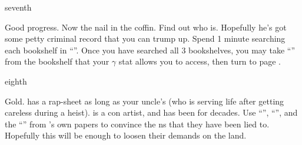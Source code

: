 \documentclass[greennotebook]{NeptuneBall}
\begin{document}
\begin{page}{seventh}

Good progress. Now the nail in the coffin. Find out who \cLiar{\MYname} is. Hopefully he's got some petty criminal record that you can trump up. Spend 1 minute searching each bookshelf in ``\sMuseum{}''. Once you have searched all 3 bookshelves, you may take ``\iRapSheet{}'' from the bookshelf that your $\gamma$ stat allows you to access, then turn to page .

\end{page}

\begin{page}{eighth}


Gold. \cLiar{\MYname} has a rap-sheet as long as your uncle's (who is serving life after getting careless during a heist). \cLiar{} is a con artist, and has been for decades. Use ``\iNorthSeasJournal{}'', ``\iRapSheet{}'', and the ``\iReference{}'' from \cPrince{}'s own papers to convince the \pPacifica{}ns that they have been lied to. Hopefully this will be enough to loosen their demands on the land.

\end{page}


\endnotebook
\end{document}
